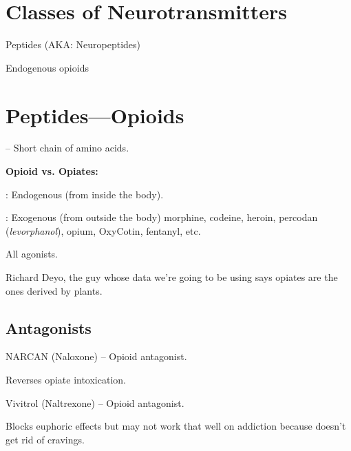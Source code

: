 \section{Classes of Neurotransmitters}

\begin{coloredlist}
    \item Peptides (AKA: Neuropeptides)
    \begin{coloredlist}
        \item Endogenous opioids
    \end{coloredlist}
\end{coloredlist}

\section{Peptides---Opioids}

\begin{coloredlist}
    \item {} -- Short chain of amino acids.
    \item \textbf{Opioid vs. Opiates:}
    \begin{coloredlist}
        \item {}: Endogenous (from inside the body).
        \item {}: Exogenous (from outside the body) morphine, codeine, heroin, percodan (\textit{levorphanol}), opium, OxyCotin, fentanyl, etc.
        \begin{coloredlist}
            \item All agonists.
        \end{coloredlist}
        \item Richard Deyo, the guy whose data we're going to be using says opiates are the ones derived by plants.
    \end{coloredlist}
\end{coloredlist}

\subsection{Antagonists}

\begin{coloredlist}
    \item NARCAN (Naloxone) -- Opioid antagonist.
    \begin{coloredlist}
        \item Reverses opiate intoxication.
    \end{coloredlist}
    \item Vivitrol (Naltrexone) -- Opioid antagonist.
    \begin{coloredlist}
        \item Blocks euphoric effects but may not work that well on addiction because doesn't get rid of cravings.
    \end{coloredlist}
\end{coloredlist}

